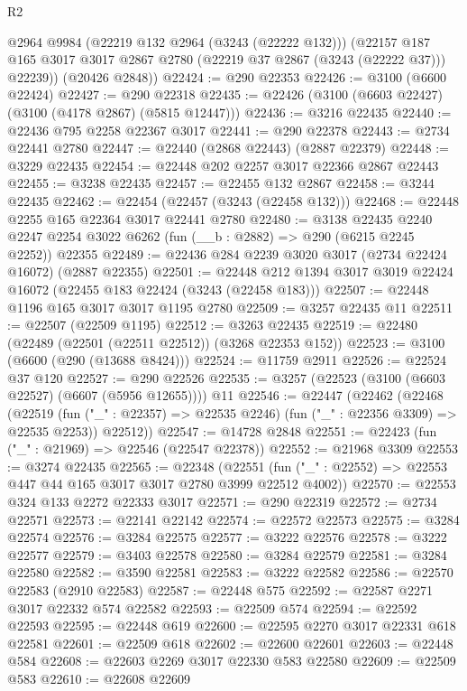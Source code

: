 \begin{lexlean}{R2}
\begin{coremodule}
        @2964
        @9984
        (@22219 @132 @2964 (@3243 (@22222 @132)))
        (@22157 @187 @165 @3017 @3017 @2867 @2780 (@22219 @37 @2867 (@3243 (@22222 @37))) @22239))
      (@20426 @2848))
@22424 := @290 @22353
@22426 := @3100 (@6600 @22424)
@22427 := @290 @22318
@22435 := @22426 (@3100 (@6603 @22427) (@3100 (@4178 @2867) (@5815 @12447)))
@22436 := @3216 @22435
@22440 := @22436 @795 @2258 @22367 @3017
@22441 := @290 @22378
@22443 := @2734 @22441 @2780
@22447 := @22440 (@2868 @22443) (@2887 @22379)
@22448 := @3229 @22435
@22454 := @22448 @202 @2257 @3017 @22366 @2867 @22443
@22455 := @3238 @22435
@22457 := @22455 @132 @2867
@22458 := @3244 @22435
@22462 := @22454 (@22457 (@3243 (@22458 @132)))
@22468 := @22448 @2255 @165 @22364 @3017 @22441 @2780
@22480 := @3138
    @22435
    @2240
    @2247
    @2254
    @3022
    @6262
    (fun (__b : @2882) => @290 (@6215 @2245 @2252))
    @22355
@22489 := @22436 @284 @2239 @3020 @3017 (@2734 @22424 @16072) (@2887 @22355)
@22501 := @22448 @212 @1394 @3017 @3019 @22424 @16072 (@22455 @183 @22424 (@3243 (@22458 @183)))
@22507 := @22448 @1196 @165 @3017 @3017 @1195 @2780
@22509 := @3257 @22435 @11
@22511 := @22507 (@22509 @1195)
@22512 := @3263 @22435
@22519 := @22480 (@22489 (@22501 (@22511 @22512)) (@3268 @22353 @152))
@22523 := @3100 (@6600 (@290 (@13688 @8424)))
@22524 := @11759 @2911
@22526 := @22524 @37 @120
@22527 := @290 @22526
@22535 := @3257 (@22523 (@3100 (@6603 @22527) (@6607 (@5956 @12655)))) @11
@22546 := @22447
    (@22462
      (@22468
        (@22519 (fun ("_" : @22357) => @22535 @2246) (fun ("_" : @22356 @3309) => @22535 @2253))
        @22512))
@22547 := @14728 @2848
@22551 := @22423 (fun ("_" : @21969) => @22546 (@22547 @22378))
@22552 := @21968 @3309
@22553 := @3274 @22435
@22565 := @22348
    (@22551 (fun ("_" : @22552) => @22553 @447 @44 @165 @3017 @3017 @2780 @3999 @22512 @4002))
@22570 := @22553 @324 @133 @2272 @22333 @3017
@22571 := @290 @22319
@22572 := @2734 @22571
@22573 := @22141 @22142
@22574 := @22572 @22573
@22575 := @3284 @22574
@22576 := @3284 @22575
@22577 := @3222 @22576
@22578 := @3222 @22577
@22579 := @3403 @22578
@22580 := @3284 @22579
@22581 := @3284 @22580
@22582 := @3590 @22581
@22583 := @3222 @22582
@22586 := @22570 @22583 (@2910 @22583)
@22587 := @22448 @575
@22592 := @22587 @2271 @3017 @22332 @574 @22582
@22593 := @22509 @574
@22594 := @22592 @22593
@22595 := @22448 @619
@22600 := @22595 @2270 @3017 @22331 @618 @22581
@22601 := @22509 @618
@22602 := @22600 @22601
@22603 := @22448 @584
@22608 := @22603 @2269 @3017 @22330 @583 @22580
@22609 := @22509 @583
@22610 := @22608 @22609

\end{coremodule}
\end{lexlean}
